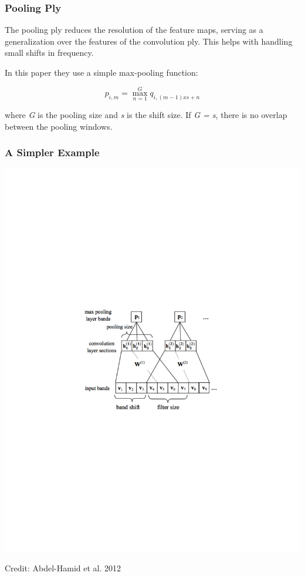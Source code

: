 \documentclass[notes]{beamer}
\begin{document}
\begin{frame}
	\frametitle{Pooling Ply}
	\begin{center}
		The pooling ply reduces the resolution of the feature maps, serving as a generalization over the features of the convolution ply. This helps with handling small shifts in frequency.
	\end{center}
	\begin{center}
		In this paper they use a simple max-pooling function:
	\end{center}
	\begin{equation*}
	p_{i,m} = \max_{n=1}^{G} q_{i, (m-1)xs+n}
	\end{equation*}
	\begin{center}
		where \textit{G} is the pooling size and \textit{s} is the shift size. If \textit{G = s}, there is no overlap between the pooling windows.
	\end{center}
	
\end{frame}

\begin{frame}
	\frametitle{A Simpler Example}
	\includegraphics[scale=.9, clip=true, trim=5cm 10cm 0 10cm]{conv-pool.pdf}
	\begin{center}
		\tiny{Credit: Abdel-Hamid et al. 2012}
	\end{center}
\end{frame}
\end{document}
